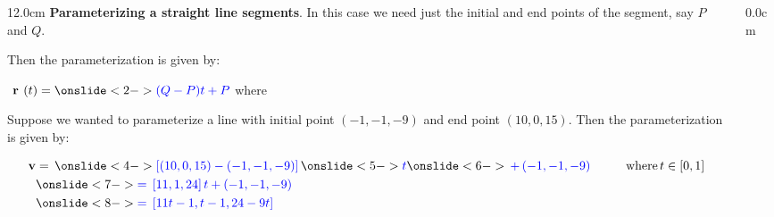 \begin{frame}
{}
\scriptsize
\begin{columns}
\begin{column}{12.0cm}
{\bf Parameterizing a straight line segments}.  In this case we need just the initial and end points of the segment, say $P$ and $Q$.

\vspace{0.4cm}

Then the parameterization is given by:

\vspace{0.2cm}

\begin{center}
	$\D{\RT = 
	\ON<2->{\B{(Q-P) t + P}}}$ \quad where \quad 
	\ON<3->{\B{$t \in [0,1]$}}
\end{center}

\vspace{0.2cm}

\EX Suppose we wanted to parameterize a line with initial point $(-1,-1,-9)$ and end point $(10,0,15)$.  Then the parameterization is given by: 

\begin{align*}
	{\bf v} 
	&= \, \ON<4->{\B{[(10,0,15)-(-1,-1,-9)]}} \, 
	\ON<5->{\B{t}} 
	\ON<6->{\B{\, + \, (-1,-1,-9)}} \hspace{1.0cm} \text{where} \, t \in [0,1] \\
	&\ON<7->{\B{= \, [11,1,24] \, t + (-1,-1,-9)}} \\
	&\ON<8->{\B{= \, [11t-1,t-1,24-9t]}} \\
\end{align*}

\vspace{2.2cm}

\end{column}
\begin{column}{0.0cm}\end{column}
\end{columns}
\end{frame}


